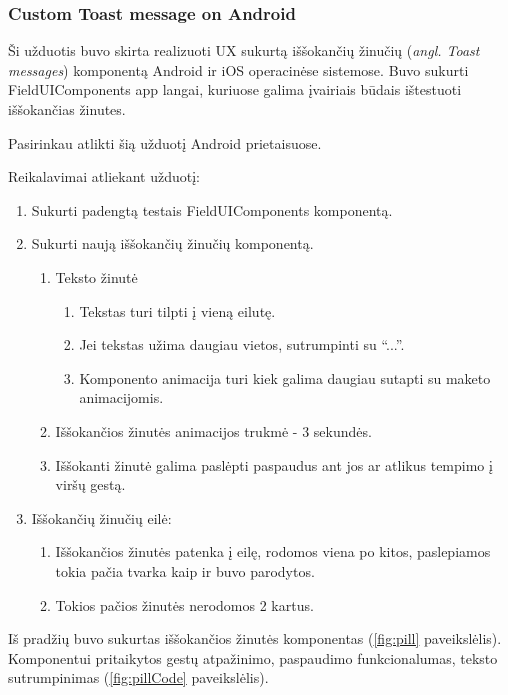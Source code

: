 \newpage
\subsubsection{Custom Toast message on Android}
Ši užduotis buvo skirta realizuoti UX sukurtą iššokančių žinučių (\emph{angl. Toast messages}) komponentą Android ir iOS operacinėse sistemose. 
Buvo sukurti FieldUIComponents app langai, kuriuose galima įvairiais būdais ištestuoti iššokančias žinutes.

Pasirinkau atlikti šią užduotį Android prietaisuose. 

Reikalavimai atliekant užduotį:
\begin{enumerate}
    \item Sukurti padengtą testais FieldUIComponents komponentą.
    \item Sukurti naują iššokančių žinučių komponentą.
    \begin{enumerate}
        \item Teksto žinutė
        \begin{enumerate}
            \item Tekstas turi tilpti į vieną eilutę.
            \item Jei tekstas užima daugiau vietos, sutrumpinti su \enquote{...}.
            \item Komponento animacija turi kiek galima daugiau sutapti su maketo animacijomis.
        \end{enumerate}
        \item Iššokančios žinutės animacijos trukmė - 3 sekundės.
        \item Iššokanti žinutė galima paslėpti paspaudus ant jos ar atlikus tempimo į viršų gestą.
    \end{enumerate}
    \item Iššokančių žinučių eilė:
    \begin{enumerate}
        \item Iššokančios žinutės patenka į eilę, rodomos viena po kitos, paslepiamos tokia pačia tvarka kaip ir buvo parodytos.
        \item Tokios pačios žinutės nerodomos 2 kartus.
    \end{enumerate}
\end{enumerate}
\bigskip
Iš pradžių buvo sukurtas iššokančios žinutės komponentas (\ref{fig:pill} paveikslėlis). Komponentui pritaikytos gestų atpažinimo, paspaudimo funkcionalumas, teksto sutrumpinimas (\ref{fig:pillCode} paveikslėlis).

